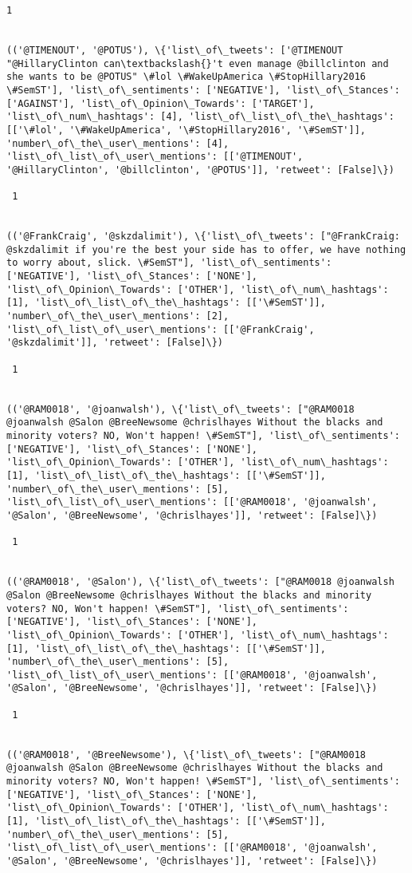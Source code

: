 \documentclass[11pt]{article}
\begin{document}
\begin{Verbatim}[commandchars=\\\{\}]
 1
 

(('@TIMENOUT', '@POTUS'), \{'list\_of\_tweets': ['@TIMENOUT  "@HillaryClinton can\textbackslash{}'t even manage @billclinton and she wants to be @POTUS" \#lol \#WakeUpAmerica \#StopHillary2016 \#SemST'], 'list\_of\_sentiments': ['NEGATIVE'], 'list\_of\_Stances': ['AGAINST'], 'list\_of\_Opinion\_Towards': ['TARGET'], 'list\_of\_num\_hashtags': [4], 'list\_of\_list\_of\_the\_hashtags': [['\#lol', '\#WakeUpAmerica', '\#StopHillary2016', '\#SemST']], 'number\_of\_the\_user\_mentions': [4], 'list\_of\_list\_of\_user\_mentions': [['@TIMENOUT', '@HillaryClinton', '@billclinton', '@POTUS']], 'retweet': [False]\})

 1
 

(('@FrankCraig', '@skzdalimit'), \{'list\_of\_tweets': ["@FrankCraig: @skzdalimit if you're the best your side has to offer, we have nothing to worry about, slick. \#SemST"], 'list\_of\_sentiments': ['NEGATIVE'], 'list\_of\_Stances': ['NONE'], 'list\_of\_Opinion\_Towards': ['OTHER'], 'list\_of\_num\_hashtags': [1], 'list\_of\_list\_of\_the\_hashtags': [['\#SemST']], 'number\_of\_the\_user\_mentions': [2], 'list\_of\_list\_of\_user\_mentions': [['@FrankCraig', '@skzdalimit']], 'retweet': [False]\})

 1
 

(('@RAM0018', '@joanwalsh'), \{'list\_of\_tweets': ["@RAM0018 @joanwalsh @Salon @BreeNewsome @chrislhayes Without the blacks and minority voters? NO, Won't happen! \#SemST"], 'list\_of\_sentiments': ['NEGATIVE'], 'list\_of\_Stances': ['NONE'], 'list\_of\_Opinion\_Towards': ['OTHER'], 'list\_of\_num\_hashtags': [1], 'list\_of\_list\_of\_the\_hashtags': [['\#SemST']], 'number\_of\_the\_user\_mentions': [5], 'list\_of\_list\_of\_user\_mentions': [['@RAM0018', '@joanwalsh', '@Salon', '@BreeNewsome', '@chrislhayes']], 'retweet': [False]\})

 1
 

(('@RAM0018', '@Salon'), \{'list\_of\_tweets': ["@RAM0018 @joanwalsh @Salon @BreeNewsome @chrislhayes Without the blacks and minority voters? NO, Won't happen! \#SemST"], 'list\_of\_sentiments': ['NEGATIVE'], 'list\_of\_Stances': ['NONE'], 'list\_of\_Opinion\_Towards': ['OTHER'], 'list\_of\_num\_hashtags': [1], 'list\_of\_list\_of\_the\_hashtags': [['\#SemST']], 'number\_of\_the\_user\_mentions': [5], 'list\_of\_list\_of\_user\_mentions': [['@RAM0018', '@joanwalsh', '@Salon', '@BreeNewsome', '@chrislhayes']], 'retweet': [False]\})

 1
 

(('@RAM0018', '@BreeNewsome'), \{'list\_of\_tweets': ["@RAM0018 @joanwalsh @Salon @BreeNewsome @chrislhayes Without the blacks and minority voters? NO, Won't happen! \#SemST"], 'list\_of\_sentiments': ['NEGATIVE'], 'list\_of\_Stances': ['NONE'], 'list\_of\_Opinion\_Towards': ['OTHER'], 'list\_of\_num\_hashtags': [1], 'list\_of\_list\_of\_the\_hashtags': [['\#SemST']], 'number\_of\_the\_user\_mentions': [5], 'list\_of\_list\_of\_user\_mentions': [['@RAM0018', '@joanwalsh', '@Salon', '@BreeNewsome', '@chrislhayes']], 'retweet': [False]\})


\end{Verbatim}
\end{document}
